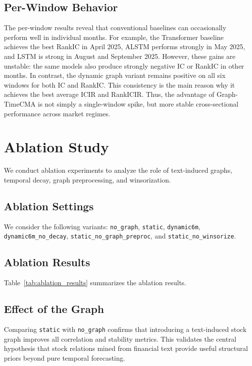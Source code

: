 \documentclass[runningheads]{llncs}
\begin{document}
\subsection{Per-Window Behavior}

The per-window results reveal that conventional baselines can occasionally perform well in individual months. For example, the Transformer baseline achieves the best RankIC in April 2025, ALSTM performs strongly in May 2025, and LSTM is strong in August and September 2025. However, these gains are unstable: the same models also produce strongly negative IC or RankIC in other months. In contrast, the dynamic graph variant remains positive on all six windows for both IC and RankIC. This consistency is the main reason why it achieves the best average ICIR and RankICIR. Thus, the advantage of Graph-TimeCMA is not simply a single-window spike, but more stable cross-sectional performance across market regimes.

\section{Ablation Study}

We conduct ablation experiments to analyze the role of text-induced graphs, temporal decay, graph preprocessing, and winsorization.

\subsection{Ablation Settings}

We consider the following variants: \texttt{no\_graph}, \texttt{static}, \texttt{dynamic6m}, \texttt{dynamic6m\_no\_decay}, \texttt{static\_no\_graph\_preproc}, and \texttt{static\_no\_winsorize}.

\subsection{Ablation Results}

Table~\ref{tab:ablation_results} summarizes the ablation results.

\subsection{Effect of the Graph}

Comparing \texttt{static} with \texttt{no\_graph} confirms that introducing a text-induced stock graph improves all correlation and stability metrics. This validates the central hypothesis that stock relations mined from financial text provide useful structural priors beyond pure temporal forecasting.
\end{document}
